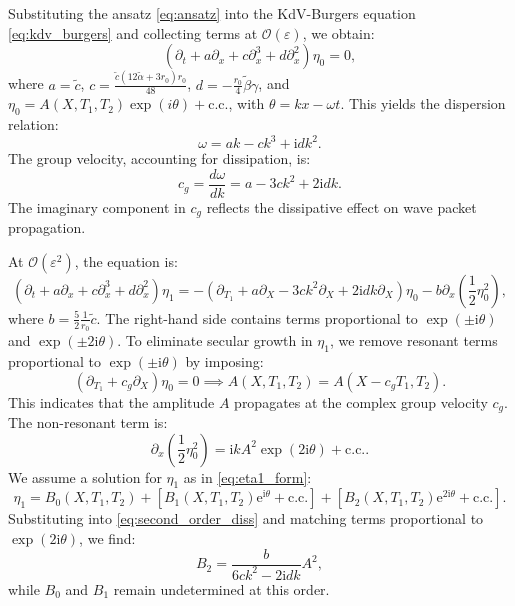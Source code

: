 \documentclass[alpha-refs, 12pt]{wiley-article}
\renewcommand{\O}{\mathcal{O}}
\newcommand{\ue}{\mathrm{e}}
\newcommand{\ui}{\mathrm{i}}
\newcommand{\eps}{\varepsilon}
\begin{document}
Substituting the ansatz \eqref{eq:ansatz} into the KdV-Burgers equation \eqref{eq:kdv_burgers} and collecting terms at $\O(\eps)$, we obtain:
\begin{equation}\label{eq:leading_order_diss}
  \left( \partial_t + a \partial_x + c \partial_x^3 + d \partial_x^2 \right) \eta_0 = 0,
\end{equation}
where $a = \tilde{c}$, $c = \frac{\tilde{c} (12 \tilde{\alpha} + 3 r_0) r_0}{48}$, $d = -\frac{r_0}{4} \tilde{\beta} \gamma$, and $\eta_0 = A(X, T_1, T_2) \exp(i \theta) + \text{c.c.}$, with $\theta = k x - \omega t$. This yields the dispersion relation:
\begin{equation}\label{eq:dispersion_diss}
  \omega = a k - c k^3 + \ui d k^2.
\end{equation}
The group velocity, accounting for dissipation, is:
\begin{equation}\label{eq:group_velocity_diss}
  c_g = \frac{d \omega}{d k} = a - 3 c k^2 + 2 \ui d k.
\end{equation}
The imaginary component in $c_g$ reflects the dissipative effect on wave packet propagation.

At $\O(\eps^2)$, the equation is:
\begin{equation}\label{eq:second_order_diss}
  \left( \partial_t + a \partial_x + c \partial_x^3 + d \partial_x^2 \right) \eta_1 = - \left( \partial_{T_1} + a \partial_X - 3 c k^2 \partial_X + 2 \ui d k \partial_X \right) \eta_0 - b \partial_x \left( \frac{1}{2} \eta_0^2 \right),
\end{equation}
where $b = \frac{5}{2} \frac{1}{r_0} \tilde{c}$. The right-hand side contains terms proportional to $\exp(\pm \ui \theta)$ and $\exp(\pm 2 \ui \theta)$. To eliminate secular growth in $\eta_1$, we remove resonant terms proportional to $\exp(\pm \ui \theta)$ by imposing:
\begin{equation}\label{eq:secular_elimination_diss}
  \left( \partial_{T_1} + c_g \partial_X \right) \eta_0 = 0 \implies A(X, T_1, T_2) = A(X - c_g T_1, T_2).
\end{equation}
This indicates that the amplitude $A$ propagates at the complex group velocity $c_g$. The non-resonant term is:
\[
\partial_x \left( \frac{1}{2} \eta_0^2 \right) = \ui k A^2 \exp(2 \ui \theta) + \text{c.c.}.
\]
We assume a solution for $\eta_1$ as in \eqref{eq:eta1_form}:
\[
\eta_1 = B_0(X, T_1, T_2) + \left[ B_1(X, T_1, T_2) \ue^{\ui \theta} + \text{c.c.} \right] + \left[ B_2(X, T_1, T_2) \ue^{2 \ui \theta} + \text{c.c.} \right].
\]
Substituting into \eqref{eq:second_order_diss} and matching terms proportional to $\exp(2 \ui \theta)$, we find:
\begin{equation}
\label{eq:B2_solution_diss}
B_2 = \frac{b}{6 c k^2 - 2 \ui d k} A^2,
\end{equation}
while $B_0$ and $B_1$ remain undetermined at this order.
\end{document}

